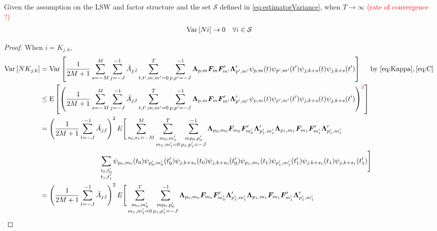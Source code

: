 \documentclass[main_document.tex]{subfiles}
\begin{document}
\begin{lemma}
	Given the assumption on the LSW and factor structure and the set $\mathcal{S}$ defined in \eqref{eq:estimatorVariance}, when $T \to \infty$ \textcolor{red}{(rate of convergence ?)}
	\begin{align*}
		\mathrm{Var}\left[N i\right] \to 0 \quad \forall i \in \mathcal{S}
	\end{align*}
\end{lemma}
\begin{proof}
When $i = K_{j,k}$, 
	\begin{align*}
		\Var{N K_{j,k}} &= \Var{\frac{\displaystyle 1}{\displaystyle 2M+1}\sum_{s=-M}^{M} \scalesum{j} \invA{j}{l} \locsum{t,t',m,m'} \scalesum{p,p'} \loadings{p}{m} \factors{m}\factors{m'}' \loadings{p'}{m'}' \wavelet{p}{m}{t}\wavelet{p'}{m'}{t'}\wavelet{j}{k+s}{t}\wavelet{j}{k+s}{t'}} \quad \text{ by } \eqref{eq:Kappa}, \eqref{eq:C}\\
				    &\leq \E{\left(\frac{\displaystyle 1}{\displaystyle 2M+1}\sum_{s=-M}^{M} \scalesum{j} \invA{j}{l} \locsum{t,t',m,m'} \scalesum{p,p'} \loadings{p}{m} \factors{m}\factors{m'}' \loadings{p'}{m'}' \wavelet{p}{m}{t}\wavelet{p'}{m'}{t'}\wavelet{j}{k+s}{t}\wavelet{j}{k+s}{t'}\right)^{\textcolor{red}{2}}} \\
				    &= \left( \frac{\displaystyle 1}{\displaystyle 2M+1} \scalesum{l}\invA{j}{l} \right)^{2} E \Bigg [ \sum_{s_0,s_1 = -M}^{M} \sum_{\substack{m_0,m_0' \\ m_1,m_1'=0}}^{T}\sum_{\substack{mp_0,p_0' \\ p_1,p_1'=-J}}^{-1}\loadings{p_0}{m_0}\factors{m_0}\factors{m_0'}' \loadings{p_1'}{m_1'}'\loadings{p_1}{m_1}\factors{m_1}\factors{m_1'}' \loadings{p_1'}{m_1'}' \\
	 & \hspace{3cm} \sum_{\substack{t_0,t_0' \\ t_1,t_1'}} \wavelet{p_0}{m_0}{t_0}\wavelet{p_0'}{m_0'}{t_0'}\wavelet{j}{k+s_0}{t_0}\wavelet{j}{k+s_0}{t_0'}\wavelet{p_1}{m_1}{t_1}\wavelet{p_1'}{m_1'}{t_1'}\wavelet{j}{k+s_1}{t_1}\wavelet{j}{k+s_1}{t_1'} \Bigg ]\\
	&= \left( \frac{\displaystyle 1}{\displaystyle 2M+1} \scalesum{l}\invA{j}{l} \right)^{2} E \Bigg [ \sum_{\substack{m_0,m_0' \\ m_1,m_1'=0}}^{T}\sum_{\substack{mp_0,p_0' \\ p_1,p_1'=-J}}^{-1}\loadings{p_0}{m_0}\factors{m_0}\factors{m_0'}' \loadings{p_1'}{m_1'}'\loadings{p_1}{m_1}\factors{m_1}\factors{m_1'}' \loadings{p_1'}{m_1'}' \\

\end{align*}
\end{proof}
\end{document}
